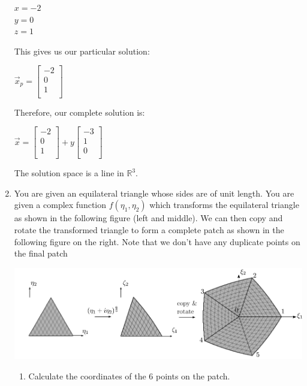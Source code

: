 \documentclass[a4paper, 11pt]{article}
\begin{document}
\begin{enumerate}
\begin{center}
    $x = -2$ \\
    $y = 0$ \\
    $z = 1$ \\
\end{center}

This gives us our particular solution:

\begin{center}
$\vec x_{p} = \begin{bmatrix}
    -2 \\
    0 \\
    1 \\
\end{bmatrix}$
\end{center}

Therefore, our complete solution is:
\begin{center}
    $\vec x = \begin{bmatrix}
    -2 \\
    0 \\
    1 \\
\end{bmatrix} + y\begin{bmatrix}
    -3 \\
    1 \\
    0 \\
\end{bmatrix}$ \\
\end{center}

The solution space is a line in $\mathbb{R}^{3}$.

\item You are given an equilateral triangle whose sides are of unit length. You are given a complex function $f(\eta_1, \eta_2)$ which transforms the equilateral triangle as shown in the following figure (left and middle). We can then copy and rotate the transformed triangle to form a complete patch as shown in the following figure on the right. Note that we don't have any duplicate points on the final patch 
\begin{center}
  \includegraphics[scale=0.4]{figs/q1.pdf}
\end{center}
\begin{enumerate}[label=(\alph*)]
\item Calculate the coordinates of the 6 points on the patch.


\end{enumerate}
\end{enumerate}
\end{document}
